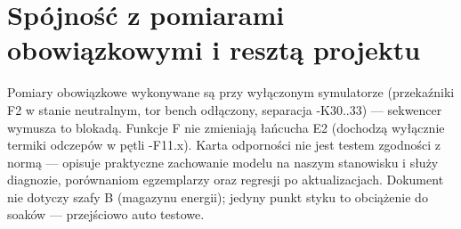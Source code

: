 \documentclass[11pt,a4paper]{article}
\begin{document}
\section{Spójność z pomiarami obowiązkowymi i resztą projektu}
Pomiary obowiązkowe wykonywane są przy wyłączonym symulatorze (przekaźniki F2 w stanie
neutralnym, tor bench odłączony, separacja -K30..33) --- sekwencer wymusza to blokadą. Funkcje F
nie zmieniają łańcucha E2 (dochodzą wyłącznie termiki odczepów w pętli -F11.x). Karta odporności
nie jest testem zgodności z normą --- opisuje praktyczne zachowanie modelu na naszym stanowisku
i służy diagnozie, porównaniom egzemplarzy oraz regresji po aktualizacjach. Dokument nie dotyczy
szafy B (magazynu energii); jedyny punkt styku to obciążenie do soaków --- przejściowo auto
testowe.
\end{document}
